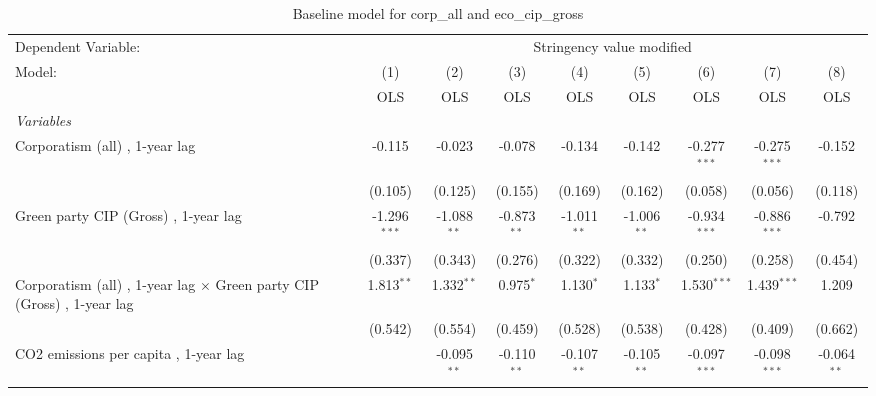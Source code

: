 
\begin{table}[htbp]
   \caption{Baseline model for corp\_all and eco\_cip\_gross}
   \centering
   \begin{tabular}{lcccccccc}
      \toprule
      Dependent Variable: & \multicolumn{8}{c}{Stringency value modified}\\
      Model:                                                                        & (1)            & (2)           & (3)           & (4)           & (5)           & (6)            & (7)            & (8)\\  
                                                                                    &  OLS           & OLS           & OLS           & OLS           & OLS           & OLS            & OLS            & OLS\\  
      \midrule
      \emph{Variables}\\
      Corporatism (all) , 1-year lag                                                & -0.115         & -0.023        & -0.078        & -0.134        & -0.142        & -0.277$^{***}$ & -0.275$^{***}$ & -0.152\\   
                                                                                    & (0.105)        & (0.125)       & (0.155)       & (0.169)       & (0.162)       & (0.058)        & (0.056)        & (0.118)\\   
      Green party CIP (Gross) , 1-year lag                                          & -1.296$^{***}$ & -1.088$^{**}$ & -0.873$^{**}$ & -1.011$^{**}$ & -1.006$^{**}$ & -0.934$^{***}$ & -0.886$^{***}$ & -0.792\\   
                                                                                    & (0.337)        & (0.343)       & (0.276)       & (0.322)       & (0.332)       & (0.250)        & (0.258)        & (0.454)\\   
      Corporatism (all) , 1-year lag $\times$ Green party CIP (Gross) , 1-year lag  & 1.813$^{**}$   & 1.332$^{**}$  & 0.975$^{*}$   & 1.130$^{*}$   & 1.133$^{*}$   & 1.530$^{***}$  & 1.439$^{***}$  & 1.209\\   
                                                                                    & (0.542)        & (0.554)       & (0.459)       & (0.528)       & (0.538)       & (0.428)        & (0.409)        & (0.662)\\   
      CO2 emissions per capita , 1-year lag                                         &                & -0.095$^{**}$ & -0.110$^{**}$ & -0.107$^{**}$ & -0.105$^{**}$ & -0.097$^{***}$ & -0.098$^{***}$ & -0.064$^{**}$\\   

\end{tabular}
\end{table}
